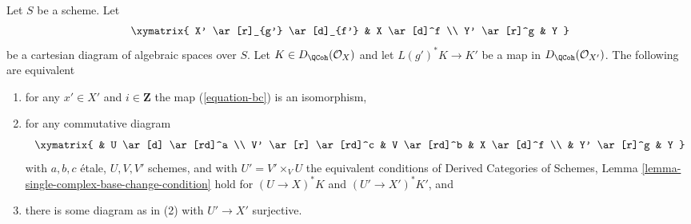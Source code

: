 \begin{lemma}
\label{lemma-single-complex-base-change-condition}
Let $S$ be a scheme. Let
$$
\xymatrix{
X' \ar[r]_{g'} \ar[d]_{f'} &
X \ar[d]^f \\
Y' \ar[r]^g &
Y
}
$$
be a cartesian diagram of algebraic spaces over $S$.
Let $K \in D_\QCoh(\mathcal{O}_X)$ and let $L(g')^*K \to K'$
be a map in $D_\QCoh(\mathcal{O}_{X'})$. The following are equivalent
\begin{enumerate}
\item for any $x' \in X'$ and $i \in \mathbf{Z}$ the map (\ref{equation-bc})
is an isomorphism,
\item for any commutative diagram
$$
\xymatrix{
& U \ar[d] \ar[rd]^a \\
V' \ar[r] \ar[rd]^c & V \ar[rd]^b & X \ar[d]^f \\
& Y' \ar[r]^g & Y
}
$$
with $a, b, c$ \'etale, $U, V, V'$ schemes, and with $U' = V' \times_V U$
the equivalent conditions of
Derived Categories of Schemes, Lemma
\ref{lemma-single-complex-base-change-condition}
hold for $(U \to X)^*K$ and $(U' \to X')^*K'$, and
\item there is some diagram as in (2) with $U' \to X'$ surjective.
\end{enumerate}
\end{lemma}

